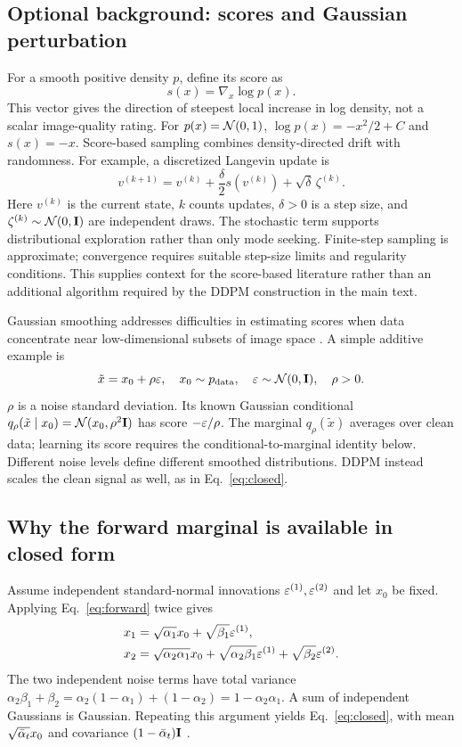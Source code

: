 \pagecut
\subsection{Optional background: scores and Gaussian perturbation}\label{app:scorebackground}
For a smooth positive density $p$, define its score as
\begin{equation}
s(x)=\nabla_x\log p(x).\label{eq:score}
\end{equation}
This vector gives the direction of steepest local increase in log density,
not a scalar image-quality rating. For $p(x)=\mathcal{N}(0,1)$,
$\log p(x)=-x^2/2+C$ and $s(x)=-x$.
Score-based sampling combines density-directed drift with randomness.
For example, a discretized Langevin update is \cite{song2019score}
\begin{equation}
v^{(k+1)}=v^{(k)}+\frac{\delta}{2}s(v^{(k)})
+\sqrt{\delta}\,\zeta^{(k)}.\label{eq:langevin}
\end{equation}
Here $v^{(k)}$ is the current state, $k$ counts updates, $\delta>0$ is a
step size, and $\zeta^{(k)}\sim\mathcal{N}(0,\mathbf{I})$ are independent draws.
The stochastic term supports distributional exploration rather than
only mode seeking. Finite-step sampling is approximate; convergence
requires suitable step-size limits and regularity conditions.
This supplies context for the score-based literature rather than an
additional algorithm required by the DDPM construction in the main text.

Gaussian smoothing addresses difficulties in estimating scores when
data concentrate near low-dimensional subsets of image space
\cite{song2019score}. A simple additive example is
\begin{equation}
\tilde x=x_0+\rho\varepsilon,\quad
x_0\sim p_{\rm data},\quad\varepsilon\sim\mathcal{N}(0,\mathbf{I}),\quad\rho>0.
\label{eq:genericnoise}
\end{equation}
$\rho$ is a noise standard deviation. Its known Gaussian conditional
$q_\rho(\tilde x\mid x_0)=\mathcal{N}(x_0,\rho^2\mathbf{I})$ has score
$-\varepsilon/\rho$. The marginal $q_\rho(\tilde x)$ averages over clean data;
learning its score requires the conditional-to-marginal identity below.
Different noise levels define different smoothed distributions.
DDPM instead scales the clean signal as well, as in Eq.~\eqref{eq:closed}.

\subsection{Why the forward marginal is available in closed form}\label{app:forwardmarginal}
Assume independent standard-normal innovations
$\varepsilon^{(1)},\varepsilon^{(2)}$ and let $x_0$ be fixed. Applying
Eq.~\eqref{eq:forward} twice gives
\begin{align*}
x_1&=\sqrt{\alpha_1}x_0+\sqrt{\beta_1}\varepsilon^{(1)},\\
x_2&=\sqrt{\alpha_2\alpha_1}x_0
+\sqrt{\alpha_2\beta_1}\varepsilon^{(1)}
+\sqrt{\beta_2}\varepsilon^{(2)}.
\end{align*}
The two independent noise terms have total variance
$\alpha_2\beta_1+\beta_2
=\alpha_2(1-\alpha_1)+(1-\alpha_2)=1-\alpha_2\alpha_1$.
A sum of independent Gaussians is Gaussian. Repeating this argument yields
Eq.~\eqref{eq:closed}, with mean $\sqrt{\bar{\alpha}_t}x_0$ and covariance
$(1-\bar{\alpha}_t)\mathbf{I}$ \cite{ho2020ddpm}.

